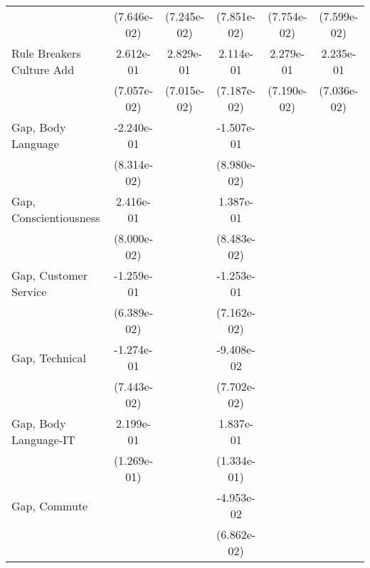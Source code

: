 {\begin{tabular}{l*{5}{c}}
                         & (7.646e-02)        & (7.245e-02)        & (7.851e-02)        & (7.754e-02)        & (7.599e-02)        \\
\addlinespace
Rule Breakers Culture Add&   2.612e-01\sym{**}&   2.829e-01\sym{**}&   2.114e-01\sym{*} &   2.279e-01\sym{*} &   2.235e-01\sym{*} \\
                         & (7.057e-02)        & (7.015e-02)        & (7.187e-02)        & (7.190e-02)        & (7.036e-02)        \\
\addlinespace
Gap, Body Language       &  -2.240e-01\sym{*} &                    &  -1.507e-01\sym{+} &                    &                    \\
                         & (8.314e-02)        &                    & (8.980e-02)        &                    &                    \\
\addlinespace
Gap, Conscientiousness   &   2.416e-01\sym{*} &                    &   1.387e-01        &                    &                    \\
                         & (8.000e-02)        &                    & (8.483e-02)        &                    &                    \\
\addlinespace
Gap, Customer Service    &  -1.259e-01\sym{+} &                    &  -1.253e-01\sym{+} &                    &                    \\
                         & (6.389e-02)        &                    & (7.162e-02)        &                    &                    \\
\addlinespace
Gap, Technical           &  -1.274e-01\sym{+} &                    &  -9.408e-02        &                    &                    \\
                         & (7.443e-02)        &                    & (7.702e-02)        &                    &                    \\
\addlinespace
Gap, Body Language-IT    &   2.199e-01\sym{+} &                    &   1.837e-01        &                    &                    \\
                         & (1.269e-01)        &                    & (1.334e-01)        &                    &                    \\
\addlinespace
Gap, Commute             &                    &                    &  -4.953e-02        &                    &                    \\
                         &                    &                    & (6.862e-02)        &                    &                    \\

\end{tabular}}
